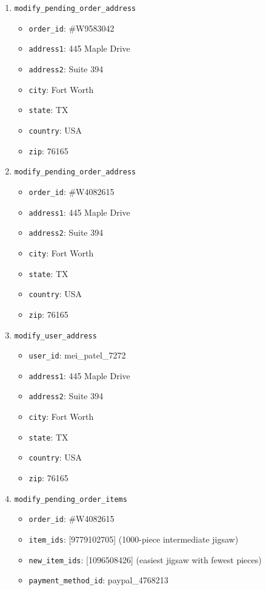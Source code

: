 \begin{enumerate}
\item \texttt{modify\_pending\_order\_address}
\begin{itemize}
\item \texttt{order\_id}: \#W9583042
\item \texttt{address1}: 445 Maple Drive
\item \texttt{address2}: Suite 394
\item \texttt{city}: Fort Worth
\item \texttt{state}: TX
\item \texttt{country}: USA
\item \texttt{zip}: 76165
\end{itemize}

\item \texttt{modify\_pending\_order\_address}
\begin{itemize}
\item \texttt{order\_id}: \#W4082615
\item \texttt{address1}: 445 Maple Drive
\item \texttt{address2}: Suite 394
\item \texttt{city}: Fort Worth
\item \texttt{state}: TX
\item \texttt{country}: USA
\item \texttt{zip}: 76165
\end{itemize}

\item \texttt{modify\_user\_address}
\begin{itemize}
\item \texttt{user\_id}: mei\_patel\_7272
\item \texttt{address1}: 445 Maple Drive
\item \texttt{address2}: Suite 394
\item \texttt{city}: Fort Worth
\item \texttt{state}: TX
\item \texttt{country}: USA
\item \texttt{zip}: 76165
\end{itemize}

\item \texttt{modify\_pending\_order\_items}
\begin{itemize}
\item \texttt{order\_id}: \#W4082615
\item \texttt{item\_ids}: [9779102705] (1000-piece intermediate jigsaw)
\item \texttt{new\_item\_ids}: [1096508426] (easiest jigsaw with fewest pieces)
\item \texttt{payment\_method\_id}: paypal\_4768213
\end{itemize}
\end{enumerate}

